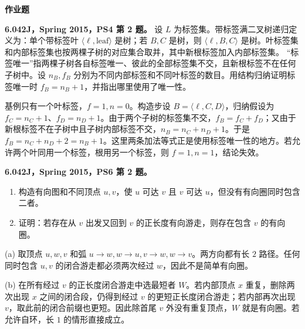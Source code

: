 \par\addvspace{7pt}\noindent\textbf{作业题}\par
\begin{exercise}\label{mit:6042-ps4-q2}
\textbf{6.042J，Spring 2015，PS4 第 2 题。}
设 $L$ 为标签集。带标签满二叉树递归定义为：单个带标签叶 $\langle\ell,\mathrm{leaf}\rangle$ 是树；若 $B,C$ 是树，则 $\langle\ell,B,C\rangle$ 是树。叶标签集和内部标签集也按两棵子树的对应集合取并，其中新根标签加入内部标签集。
“标签唯一”指两棵子树各自标签唯一、彼此的全部标签集不交，且新根标签不在任何子树中。设 $n_B,f_B$ 分别为不同内部标签和不同叶标签的数目。用结构归纳证明标签唯一时 $f_B=n_B+1$，并指出哪里使用了唯一性。
\end{exercise}
\begin{solution}
基例只有一个叶标签，$f=1,n=0$。构造步设 $B=\langle\ell,C,D\rangle$，归纳假设为 $f_C=n_C+1$、$f_D=n_D+1$。由于两个子树的标签集不交，$f_B=f_C+f_D$；又由于新根标签不在子树中且子树内部标签不交，$n_B=n_C+n_D+1$。于是 $f_B=n_C+n_D+2=n_B+1$。这里两条加法等式正是使用标签唯一性的地方。若允许两个叶同用一个标签，根用另一个标签，则 $f=1,n=1$，结论失效。
\end{solution}

\begin{exercise}\label{mit:6042-ps6-q2}
\textbf{6.042J，Spring 2015，PS6 第 2 题。}
\begin{enumerate}[label=(\alph*)]
\item 构造有向图和不同顶点 $u,v$，使 $u$ 可达 $v$ 且 $v$ 可达 $u$，但没有有向圈同时包含二者。
\item 证明：若存在从 $v$ 出发又回到 $v$ 的正长度有向游走，则存在包含 $v$ 的有向圈。
\end{enumerate}
\end{exercise}
\begin{solution}
(a) 取顶点 $u,w,v$ 和弧 $u\to w,w\to u,v\to w,w\to v$。两方向都有长 $2$ 路径。任何同时包含 $u,v$ 的闭合游走都必须两次经过 $w$，因此不是简单有向圈。

(b) 在所有经过 $v$ 的正长度闭合游走中选最短者 $W$。若内部顶点 $x$ 重复，删除两次出现 $x$ 之间的闭合段，仍得到经过 $v$ 的更短正长度闭合游走；若内部再次出现 $v$，取此前的闭合前缀也更短。因此除首尾 $v$ 外没有重复顶点，$W$ 就是有向圈。若允许自环，长 $1$ 的情形直接成立。
\end{solution}

